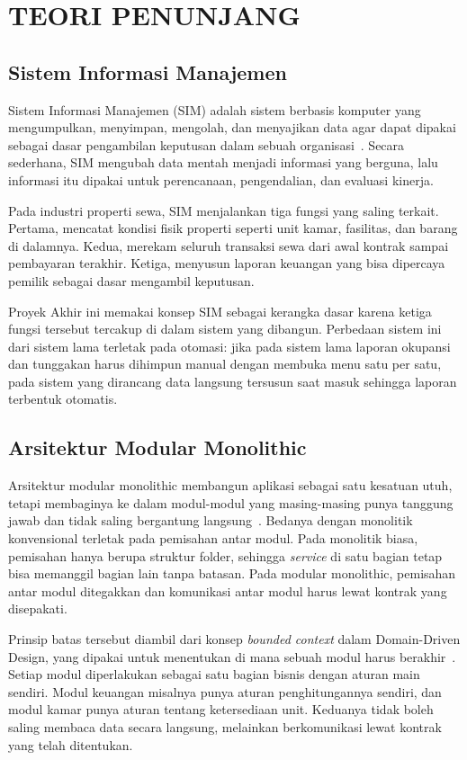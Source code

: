 \section{TEORI PENUNJANG}

\subsection{Sistem Informasi Manajemen}

Sistem Informasi Manajemen (SIM) adalah sistem berbasis komputer yang mengumpulkan, menyimpan, mengolah, dan menyajikan data agar dapat dipakai sebagai dasar pengambilan keputusan dalam sebuah organisasi~\cite{tjahjanto2025}. Secara sederhana, SIM mengubah data mentah menjadi informasi yang berguna, lalu informasi itu dipakai untuk perencanaan, pengendalian, dan evaluasi kinerja.

Pada industri properti sewa, SIM menjalankan tiga fungsi yang saling terkait. Pertama, mencatat kondisi fisik properti seperti unit kamar, fasilitas, dan barang di dalamnya. Kedua, merekam seluruh transaksi sewa dari awal kontrak sampai pembayaran terakhir. Ketiga, menyusun laporan keuangan yang bisa dipercaya pemilik sebagai dasar mengambil keputusan.

Proyek Akhir ini memakai konsep SIM sebagai kerangka dasar karena ketiga fungsi tersebut tercakup di dalam sistem yang dibangun. Perbedaan sistem ini dari sistem lama terletak pada otomasi: jika pada sistem lama laporan okupansi dan tunggakan harus dihimpun manual dengan membuka menu satu per satu, pada sistem yang dirancang data langsung tersusun saat masuk sehingga laporan terbentuk otomatis.

\subsection{Arsitektur Modular Monolithic}

Arsitektur modular monolithic membangun aplikasi sebagai satu kesatuan utuh, tetapi membaginya ke dalam modul-modul yang masing-masing punya tanggung jawab dan tidak saling bergantung langsung~\cite{alqoran2025}. Bedanya dengan monolitik konvensional terletak pada pemisahan antar modul. Pada monolitik biasa, pemisahan hanya berupa struktur folder, sehingga \textit{service} di satu bagian tetap bisa memanggil bagian lain tanpa batasan. Pada modular monolithic, pemisahan antar modul ditegakkan dan komunikasi antar modul harus lewat kontrak yang disepakati.

Prinsip batas tersebut diambil dari konsep \textit{bounded context} dalam Domain-Driven Design, yang dipakai untuk menentukan di mana sebuah modul harus berakhir~\cite{dragoni2017}. Setiap modul diperlakukan sebagai satu bagian bisnis dengan aturan main sendiri. Modul keuangan misalnya punya aturan penghitungannya sendiri, dan modul kamar punya aturan tentang ketersediaan unit. Keduanya tidak boleh saling membaca data secara langsung, melainkan berkomunikasi lewat kontrak yang telah ditentukan.

